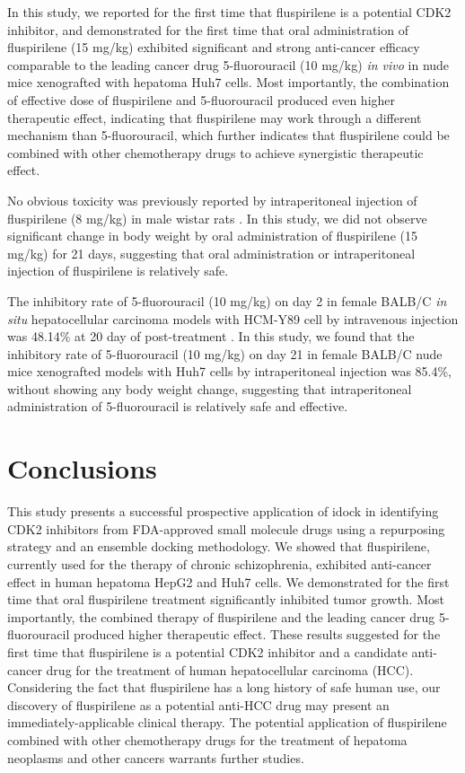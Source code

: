 \documentclass[10pt,letterpaper]{article}
\begin{document}
In this study, we reported for the first time that fluspirilene is a potential CDK2 inhibitor, and demonstrated for the first time that oral administration of fluspirilene (15 mg/kg) exhibited significant and strong anti-cancer efficacy comparable to the leading cancer drug 5-fluorouracil (10 mg/kg) \textit{in vivo} in nude mice xenografted with hepatoma Huh7 cells. Most importantly, the combination of effective dose of fluspirilene and 5-fluorouracil produced even higher therapeutic effect, indicating that fluspirilene may work through a different mechanism than 5-fluorouracil, which further indicates that fluspirilene could be combined with other chemotherapy drugs to achieve synergistic therapeutic effect.

No obvious toxicity was previously reported by intraperitoneal injection of fluspirilene (8 mg/kg) in male wistar rats \cite{1610}. In this study, we did not observe significant change in body weight by oral administration of fluspirilene (15 mg/kg) for 21 days, suggesting that oral administration or intraperitoneal injection of fluspirilene is relatively safe.

The inhibitory rate of 5-fluorouracil (10 mg/kg) on day 2 in female BALB/C \textit{in situ} hepatocellular carcinoma models with HCM-Y89 cell by intravenous injection was 48.14\% at 20 day of post-treatment \cite{1609}. In this study, we found that the inhibitory rate of 5-fluorouracil (10 mg/kg) on day 21 in female BALB/C nude mice xenografted models with Huh7 cells by intraperitoneal injection was 85.4\%, without showing any body weight change, suggesting that intraperitoneal administration of 5-fluorouracil is relatively safe and effective.

\section*{Conclusions}

This study presents a successful prospective application of idock \cite{1153,1362} in identifying CDK2 inhibitors from FDA-approved small molecule drugs using a repurposing strategy and an ensemble docking methodology. We showed that fluspirilene, currently used for the therapy of chronic schizophrenia, exhibited anti-cancer effect in human hepatoma HepG2 and Huh7 cells. We demonstrated for the first time that oral fluspirilene treatment significantly inhibited tumor growth. Most importantly, the combined therapy of fluspirilene and the leading cancer drug 5-fluorouracil produced higher therapeutic effect. These results suggested for the first time that fluspirilene is a potential CDK2 inhibitor and a candidate anti-cancer drug for the treatment of human hepatocellular carcinoma (HCC). Considering the fact that fluspirilene has a long history of safe human use, our discovery of fluspirilene as a potential anti-HCC drug may present an immediately-applicable clinical therapy. The potential application of fluspirilene combined with other chemotherapy drugs for the treatment of hepatoma neoplasms and other cancers warrants further studies.
\end{document}
